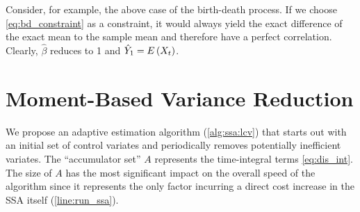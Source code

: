 \begin{example} Consider, for example, the above case of the birth-death process.
If we choose \eqref{eq:bd_constraint} as a constraint, it would always yield
the exact difference of the exact mean to the sample mean and therefore have a 
	perfect correlation. Clearly, $\hat\beta$ reduces to \num{1} and $\hat Y_1 = {E}\left(X_t\right)$.
\end{example}

\section{Moment-Based Variance Reduction}\label{sec:cv:algo}
We propose an adaptive estimation algorithm (\autoref{alg:ssa:lcv}) that starts out with
an initial set of control variates
and periodically removes potentially inefficient variates.
The ``accumulator set'' $A$ represents the time-integral terms \eqref{eq:dis_int}.
The size of $A$ has the most significant impact on the overall speed of the algorithm
since it represents the only factor incurring a direct cost increase in the \ac{SSA} itself (\autoref{line:run_ssa}).

